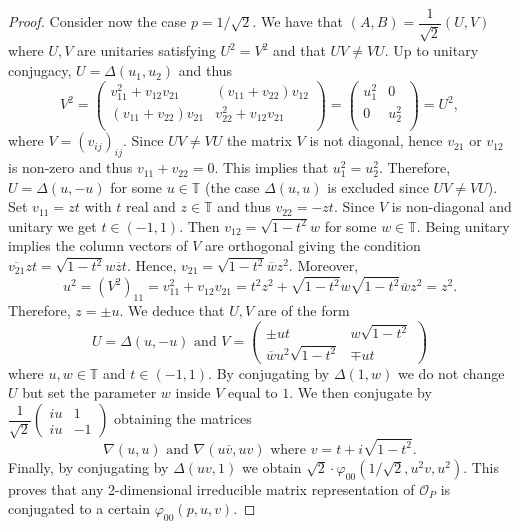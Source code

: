 \documentclass[12pt, a4paper]{amsart}
\def\T{\mathbb{T}}
\newcommand{\CO}[0]{\mathcal{O}} \newcommand{\CP}[0]{\mathcal{P}}
\numberwithin{equation}{section}
\begin{document}
\begin{proof}
Consider now the case $p=1/\sqrt 2.$
We have that $(A,B)=\dfrac{1}{\sqrt 2}(U,V)$ where $U,V$ are unitaries satisfying $U^2=V^2$ and that $UV\neq VU.$
Up to unitary conjugacy, $U=\Delta(u_1,u_2)$ and thus 
$$V^2=
\left(\begin{array}{cc}
v_{11}^2+v_{12}v_{21} & (v_{11}+v_{22})v_{12}\\
 (v_{11}+v_{22})v_{21} & v_{22}^2+v_{12}v_{21} \\
 \end{array}\right)=
\left(\begin{array}{cc}
u_{1}^2  & 0\\
0 & u_{2}^2 \\
\end{array}\right)=U^2,$$
where $V=(v_{ij})_{ij}$.
Since $UV\neq VU$ the matrix $V$ is not diagonal, hence $v_{21}$ or $v_{12}$ is non-zero and thus $v_{11}+v_{22}=0$.
This implies that $u_1^2=u_2^2$.
Therefore, $U=\Delta(u,-u)$ for some $u\in\T$ (the case $\Delta(u,u)$ is excluded since $UV\neq VU$).
Set $v_{11}=zt$ with $t$ real and $z\in\T$ and thus $v_{22}=-zt.$
Since $V$ is non-diagonal and unitary we get $t\in (-1,1).$
Then $v_{12}=\sqrt{1-t^2} w$ for some $w\in\T$.
Being unitary implies the column vectors of $V$ are orthogonal giving the condition $\overline{v_{21}}zt=\sqrt{1-t^2} w \overline z t.$
Hence, $v_{21}=\sqrt{1-t^2} \overline{w}{z}^2$.
Moreover, $$u^2=(V^2)_{11}=v_{11}^2+v_{12}v_{21}=t^2z^2+ \sqrt{1-t^2}w \sqrt{1-t^2}\overline{w} z^2 =z^2.$$
Therefore, $z=\pm u.$
We deduce that $U,V$ are of the form
$$U=\Delta(u,-u) \text{ and } V=\begin{pmatrix}
\pm ut & w\sqrt{1-t^2}\\
\overline{w}u^2\sqrt{1-t^2} & \mp ut
\end{pmatrix}$$
where $u,w\in\T$ and $t\in (-1,1).$
By conjugating by $\Delta(1,w)$ we do not change $U$ but set the parameter $w$ inside $V$ equal to $1$.
We then conjugate by $\dfrac{1}{\sqrt{2}}\begin{pmatrix}
iu & 1\\
i u & -1
\end{pmatrix}$ obtaining the matrices 
$$\nabla(u,u) \text{ and } \nabla(u\overline v, uv) \text{ where } v=t+i\sqrt{1-t^2}.$$
Finally, by conjugating by $\Delta(uv,1)$ we obtain $\sqrt 2\cdot \varphi_{00}(1/\sqrt 2,u^2v,u^2)$.
This proves that any 2-dimensional irreducible matrix representation of $\CO_P$ is conjugated to a certain $\varphi_{00}(p,u,v).$


\end{proof}
\end{document}
